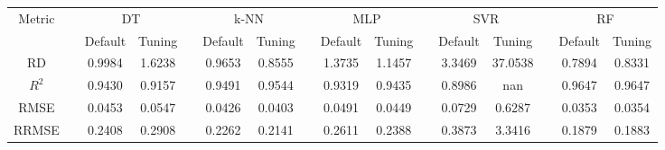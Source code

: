 \begin{table}[!htbp]
	\setlength{\tabcolsep}{3pt}
	\begin{tabular}{cccccccccccccccc}
		\toprule
		\multirow{2}{*}{Metric} & & \multicolumn{2}{c}{DT} & & \multicolumn{2}{c}{k-NN} & & \multicolumn{2}{c}{MLP} & & \multicolumn{2}{c}{SVR} & & \multicolumn{2}{c}{RF}\\
		 \cline{3-4} \cline{6-7} \cline{9-10} \cline{12-13} \cline{15-16}
		  & & Default & Tuning & & Default & Tuning & & Default & Tuning & & Default & Tuning & & Default & Tuning\\
		\midrule
		RD & & 0.9984 & 1.6238 & & 0.9653 & 0.8555 & & 1.3735 & 1.1457 & & 3.3469 & 37.0538 & & 0.7894 & 0.8331\\
		$R^2$ & & 0.9430 & 0.9157 & & 0.9491 & 0.9544 & & 0.9319 & 0.9435 & & 0.8986 & nan & & 0.9647 & 0.9647\\
		RMSE & & 0.0453 & 0.0547 & & 0.0426 & 0.0403 & & 0.0491 & 0.0449 & & 0.0729 & 0.6287 & & 0.0353 & 0.0354\\
		RRMSE & & 0.2408 & 0.2908 & & 0.2262 & 0.2141 & & 0.2611 & 0.2388 & & 0.3873 & 3.3416 & & 0.1879 & 0.1883\\
		\bottomrule
	\end{tabular}
\end{table}
